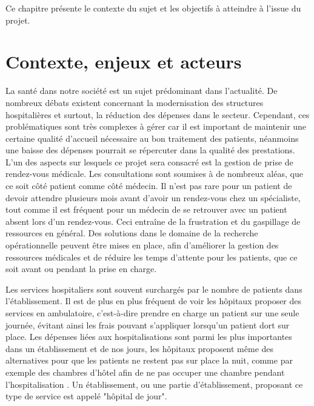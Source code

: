 \documentclass{polytech/polytech}
\begin{document}
Ce chapitre présente le contexte du sujet et les objectifs à atteindre à l'issue du projet.

\section{Contexte, enjeux et acteurs}

La santé dans notre société est un sujet prédominant dans l'actualité. De nombreux débats existent concernant la modernisation des structures hospitalières et surtout, la réduction des dépenses dans le secteur. Cependant, ces problématiques sont très complexes à gérer car il est important de maintenir une certaine qualité d'accueil nécessaire au bon traitement des patients, néanmoins une baisse des dépenses pourrait se répercuter dans la qualité des prestations. L'un des aspects sur lesquels ce projet sera consacré est la gestion de prise de rendez-vous médicale. Les consultations sont soumises à de nombreux aléas, que ce soit côté patient comme côté médecin. Il n'est pas rare pour un patient de devoir attendre plusieurs mois avant d'avoir un rendez-vous chez un spécialiste, tout comme il est fréquent pour un médecin de se retrouver avec un patient absent lors d'un rendez-vous. Ceci entraîne de la frustration et du gaspillage de ressources en général. Des solutions dans le domaine de la recherche opérationnelle peuvent être mises en place, afin d'améliorer la gestion des ressources médicales et de réduire les temps d'attente pour les patients, que ce soit avant ou pendant la prise en charge. 

Les services hospitaliers sont souvent surchargés par le nombre de patients dans l'établissement. Il est de plus en plus fréquent de voir les hôpitaux proposer des services en ambulatoire, c'est-à-dire prendre en charge un patient sur une seule journée, évitant ainsi les frais pouvant s'appliquer lorsqu'un patient dort sur place. Les dépenses liées aux hospitalisations sont parmi les plus importantes dans un établissement et de nos jours, les hôpitaux proposent même des alternatives pour que les patients ne restent pas sur place la nuit, comme par exemple des chambres d'hôtel afin de ne pas occuper une chambre pendant l'hospitalisation \cite{noauthor_chu_nodate}. Un établissement, ou une partie d'établissement, proposant ce type de service est appelé "hôpital de jour".
\end{document}
